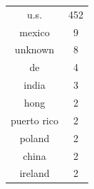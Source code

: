 \begin{table}[!h]
    \begin{subtable}[ht]{.5\textwidth}
    \centering
    \begin{tabular}{cc}
        u.s. & 452 \\
        mexico & 9 \\
        unknown & 8 \\
        de & 4 \\
        india & 3 \\
        hong & 2 \\
        puerto rico & 2 \\
        poland & 2 \\
        china & 2 \\
        ireland & 2 \\
    \end{tabular}
    \end{subtable}
\end{table}


